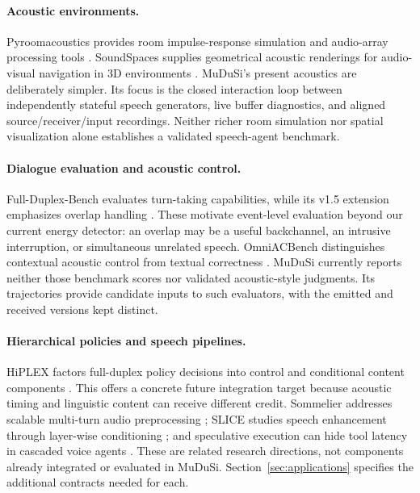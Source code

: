 \documentclass{article}
\begin{document}
\paragraph{Acoustic environments.} Pyroomacoustics provides room impulse-response simulation and audio-array processing tools \citep{scheibler2017pyroomacoustics}. SoundSpaces supplies geometrical acoustic renderings for audio-visual navigation in 3D environments \citep{chen2020soundspaces}. MuDuSi's present acoustics are deliberately simpler. Its focus is the closed interaction loop between independently stateful speech generators, live buffer diagnostics, and aligned source/receiver/input recordings. Neither richer room simulation nor spatial visualization alone establishes a validated speech-agent benchmark.

\paragraph{Dialogue evaluation and acoustic control.} Full-Duplex-Bench evaluates turn-taking capabilities, while its v1.5 extension emphasizes overlap handling \citep{lin2025fullduplexbench,lin2025overlap}. These motivate event-level evaluation beyond our current energy detector: an overlap may be a useful backchannel, an intrusive interruption, or simultaneous unrelated speech. OmniACBench distinguishes contextual acoustic control from textual correctness \citep{kim2026omniacbench}. MuDuSi currently reports neither those benchmark scores nor validated acoustic-style judgments. Its trajectories provide candidate inputs to such evaluators, with the emitted and received versions kept distinct.

\paragraph{Hierarchical policies and speech pipelines.} HiPLEX factors full-duplex policy decisions into control and conditional content components \citep{jung2026hiplex}. This offers a concrete future integration target because acoustic timing and linguistic content can receive different credit. Sommelier addresses scalable multi-turn audio preprocessing \citep{jung2026sommelier}; SLICE studies speech enhancement through layer-wise conditioning \citep{moon2026slice}; and speculative execution can hide tool latency in cascaded voice agents \citep{jung2026speculative}. These are related research directions, not components already integrated or evaluated in MuDuSi. Section~\ref{sec:applications} specifies the additional contracts needed for each.
\end{document}
